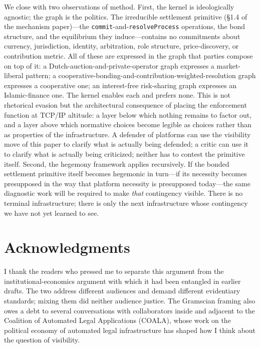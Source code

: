 \documentclass[11pt,a4paper]{article}
\theoremstyle{remark}
\begin{document}
We close with two observations of method. First, the kernel is
ideologically agnostic; the graph is the politics. The
irreducible settlement
primitive (§1.4 of the mechanism paper)---the
\texttt{commit}-and-\texttt{resolveProcess} operations, the bond
structure, and the equilibrium they induce---contains no
commitments about currency, jurisdiction, identity, arbitration,
role structure, price-discovery, or contribution metric. All of
these are expressed in the graph that parties compose on top of
it: a Dutch-auction-and-private-operator graph expresses a
market-liberal pattern; a cooperative-bonding-and-contribution-weighted-resolution
graph expresses a cooperative one; an interest-free risk-sharing
graph expresses an Islamic-finance one. The kernel enables each
and prefers none. This is not rhetorical evasion but the
architectural consequence of placing the enforcement function at
TCP/IP altitude: a layer below which nothing remains to factor
out, and a layer above which normative choices become legible as
choices rather than as properties of the infrastructure. A
defender of platforms can use the visibility move of this paper
to clarify what is actually being defended; a critic can use it
to clarify what is actually being criticized; neither has to
contest the primitive itself. Second, the hegemony framework
applies recursively. If the bonded settlement
primitive itself becomes hegemonic in turn---if its necessity
becomes presupposed in the way that platform necessity is
presupposed today---the same diagnostic work will be required to
make \emph{that} contingency visible. There is no terminal
infrastructure; there is only the next infrastructure whose
contingency we have not yet learned to see.

\section*{Acknowledgments}
I thank the readers who pressed me to separate this argument from
the institutional-economics argument with which it had been
entangled in earlier drafts. The two address different audiences
and demand different evidentiary standards; mixing them did
neither audience justice. The Gramscian framing also owes a debt
to several conversations with collaborators inside and adjacent to
the Coalition of Automated Legal Applications (COALA), whose work
on the political economy of automated legal infrastructure has
shaped how I think about the question of visibility.


\end{document}
